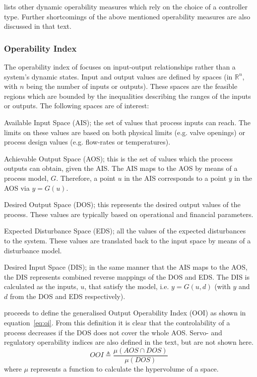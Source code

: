 \documentclass[final,authoryear,5pt,times,twocolumn]{elsarticle}
\begin{document}
\citet{vinsonphd} lists other dynamic operability measures which rely on the choice of a controller type. Further shortcomings of the above mentioned operability measures are also discussed in that text. 

\subsubsection{Operability Index}
The operability index of \citet{vinsonartoi} focuses on input-output relationships rather than a system's dynamic states. 
Input and output values are defined by spaces (in $\mathbb{R}^n$, with $n$ being the number of inputs or outputs). 
These spaces are the feasible regions which are bounded by the inequalities describing the ranges of the inputs or outputs. 
The following spaces are of interest:

Available Input Space (AIS); the set of values that process      inputs can reach. 
The limits on these values are based on both physical limits (e.g.     valve openings) or process design values (e.g. flow-rates or temperatures). 

Achievable Output Space (AOS); this is the set of values which the process outputs can obtain, given the AIS. 
The AIS maps to the AOS by means of a process model, $G$. 
Therefore, a point $u$ in the AIS corresponds to a point $y$ in the AOS via $y=G(u)$. 

Desired Output Space (DOS); this represents the desired output values of the process. 
These values are typically based on operational and financial   parameters. 

Expected Disturbance Space (EDS); all the values of the expected disturbances to the system. 
These values are translated back to the input space by means of a disturbance model.

Desired Input Space (DIS); in the same manner that the AIS maps to the AOS, the DIS represents combined reverse mappings of the DOS and EDS.
The DIS is calculated as the inputs, $u$, that satisfy the model, i.e. $y=G(u,d)$ (with $y$ and $d$ from the DOS and EDS respectively).

\citet{vinsonartoi} proceeds to define the generalised Output Operability Index (OOI) as shown in equation~\ref{eq:oi}. 
From this definition it is clear that the controlability of a process decreases if the DOS does not cover the whole AOS. 
Servo- and regulatory operability indices are also defined in the text, but are not shown here.
\begin{equation}
  \label{eq:oi}
     OOI \triangleq \frac{\mu(AOS\cap DOS)}{\mu(DOS)}
\end{equation}
where $\mu$ represents a function to calculate the hypervolume of a space.
\end{document}
